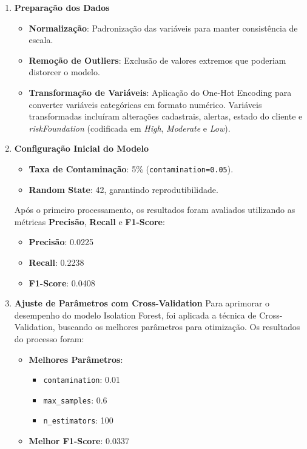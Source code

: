 \documentclass[12pt,a4paper]{article}
\begin{document}
\begin{enumerate}
    \item \textbf{Prepara\c{c}\~{a}o dos Dados}
    \begin{itemize}
        \item \textbf{Normaliza\c{c}\~{a}o}: Padroniza\c{c}\~{a}o das vari\'aveis para manter consist\^encia de escala.
        \item \textbf{Remo\c{c}\~{a}o de Outliers}: Exclus\~{a}o de valores extremos que poderiam distorcer o modelo.
        \item \textbf{Transforma\c{c}\~{a}o de Vari\'aveis}: Aplica\c{c}\~{a}o do One-Hot Encoding para converter vari\'aveis categ\'oricas em formato num\'erico. Vari\'aveis transformadas inclu\'iram altera\c{c}\~{o}es cadastrais, alertas, estado do cliente e \textit{riskFoundation} (codificada em \textit{High}, \textit{Moderate} e \textit{Low}).
    \end{itemize}

    \item \textbf{Configura\c{c}\~{a}o Inicial do Modelo}
    \begin{itemize}
        \item \textbf{Taxa de Contamina\c{c}\~{a}o}: 5\% (\texttt{contamination=0.05}).
        \item \textbf{Random State}: 42, garantindo reprodutibilidade.
    \end{itemize}

    Ap\'os o primeiro processamento, os resultados foram avaliados utilizando as m\'etricas \textbf{Precis\~{a}o}, \textbf{Recall} e \textbf{F1-Score}:
    \begin{itemize}
        \item \textbf{Precis\~{a}o}: 0.0225
        \item \textbf{Recall}: 0.2238
        \item \textbf{F1-Score}: 0.0408
    \end{itemize}

    \item \textbf{Ajuste de Par\^ametros com Cross-Validation}
    Para aprimorar o desempenho do modelo Isolation Forest, foi aplicada a t\'ecnica de Cross-Validation, buscando os melhores par\^ametros para otimiza\c{c}\~{a}o. Os resultados do processo foram:
    \begin{itemize}
        \item \textbf{Melhores Par\^ametros}:
        \begin{itemize}
            \item \texttt{contamination}: 0.01
            \item \texttt{max\_samples}: 0.6
            \item \texttt{n\_estimators}: 100
        \end{itemize}
        \item \textbf{Melhor F1-Score}: 0.0337
    \end{itemize}


\end{enumerate}
\end{document}
